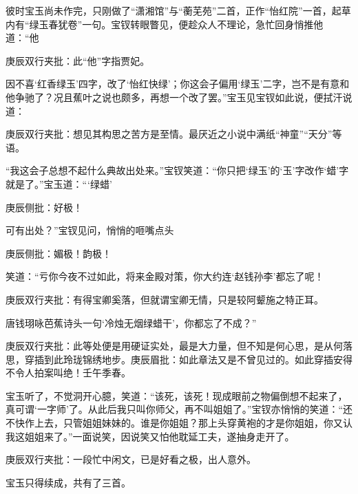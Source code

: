 \begin{parag}
    彼时宝玉尚未作完，只刚做了“潇湘馆”与“蘅芜苑”二首，正作“怡红院”一首，起草内有“绿玉春犹卷”一句。宝钗转眼瞥见，便趁众人不理论，急忙回身悄推他道：“他\begin{note}庚辰双行夹批：此“他”字指贾妃。\end{note}因不喜‘红香绿玉’四字，改了‘怡红快绿’；你这会子偏用‘绿玉’二字，岂不是有意和他争驰了？况且蕉叶之说也颇多，再想一个改了罢。”宝玉见宝钗如此说，便拭汗说道：\begin{note}庚辰双行夹批：想见其构思之苦方是至情。最厌近之小说中满纸“神童”“天分”等语。\end{note}“我这会子总想不起什么典故出处来。”宝钗笑道：“你只把‘绿玉’的‘玉’字改作‘蜡’字就是了。”宝玉道：“‘绿蜡’\begin{note}庚辰侧批：好极！\end{note}可有出处？”宝钗见问，悄悄的咂嘴点头\begin{note}庚辰侧批：媚极！韵极！\end{note}笑道：“亏你今夜不过如此，将来金殿对策，你大约连‘赵钱孙李’都忘了呢！\begin{note}庚辰双行夹批：有得宝卿奚落，但就谓宝卿无情，只是较阿颦施之特正耳。\end{note}唐钱珝咏芭蕉诗头一句‘冷烛无烟绿蜡干’，你都忘了不成？”\begin{note}庚辰双行夹批：此等处便是用硬证实处，最是大力量，但不知是何心思，是从何落思，穿插到此玲珑锦绣地步。庚辰眉批：如此章法又是不曾见过的。如此穿插安得不令人拍案叫绝！壬午季春。\end{note}宝玉听了，不觉洞开心臆，笑道：“该死，该死！现成眼前之物偏倒想不起来了，真可谓‘一字师’了。从此后我只叫你师父，再不叫姐姐了。”宝钗亦悄悄的笑道：“还不快作上去，只管姐姐妹妹的。谁是你姐姐？那上头穿黄袍的才是你姐姐，你又认我这姐姐来了。”一面说笑，因说笑又怕他耽延工夫，遂抽身走开了。\begin{note}庚辰双行夹批：一段忙中闲文，已是好看之极，出人意外。\end{note}宝玉只得续成，共有了三首。
\end{parag}


